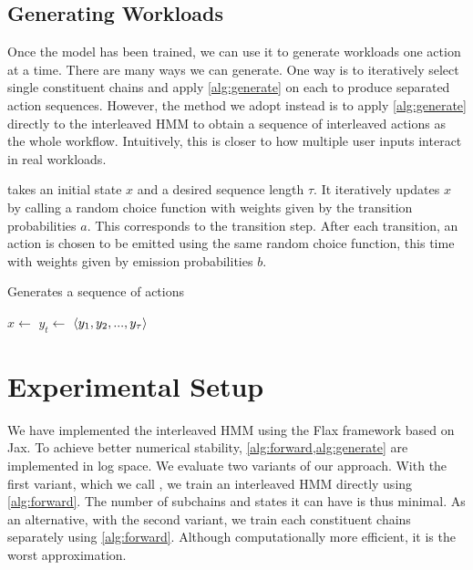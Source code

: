 \subsection{Generating Workloads}

Once the model has been trained, we can use it to generate workloads one action at a time. There are many ways we can generate. One way is to iteratively select single constituent chains and apply \cref{alg:generate} on each to produce separated action sequences. However, the method we adopt instead is to apply \cref{alg:generate} directly to the interleaved HMM to obtain a sequence of interleaved actions as the whole workflow. Intuitively, this is closer to how multiple user inputs interact in real workloads.

 takes an initial state \(x\) and a desired sequence length \(\tau\). It iteratively updates \(x\) by calling a random choice function with weights given by the transition probabilities \(a\). This corresponds to the transition step. After each transition, an action is chosen to be emitted using the same random choice function, this time with weights given by emission probabilities \(b\).

\begin{algorithm}
    \caption{Generates a sequence of actions}\label{alg:generate}
    \begin{algorithmic}[1]
                \State $x \gets$ 
                \State $y_t \gets$ 
            \EndFor
            \State \Return $\langle y_1, y_2, ..., y_\tau\rangle$
        \EndProcedure
    \end{algorithmic}
\end{algorithm}

\section{Experimental Setup}\label{sec:experimental_setup}

We have implemented the interleaved HMM using the Flax\cite{Heek2023-nl} framework based on Jax\cite{Bradbury2018-jz}. To achieve better numerical stability, \cref{alg:forward,alg:generate} are implemented in log space.
We evaluate two variants of our approach. With the first variant, which we call \worklogalpha, we train an interleaved HMM directly using \cref{alg:forward}. The number of subchains and states it can have is thus minimal. As an alternative, with the second variant, we train each constituent chains separately using \cref{alg:forward}. Although computationally more efficient, it is the worst approximation.

